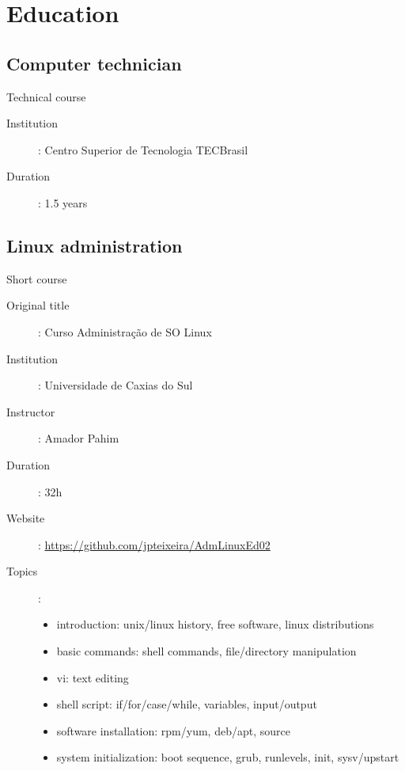 \section*{Education}
\label{sec:education}

\subsection*{Computer technician}

Technical course

\begin{description}
    \item[Institution]: Centro Superior de Tecnologia TECBrasil
    \item[Duration]: 1.5 years
\end{description}

\subsection*{Linux administration}

Short course

\begin{description}
    \item[Original title]: Curso Administração de SO Linux
    \item[Institution]: Universidade de Caxias do Sul
    \item[Instructor]: Amador Pahim
    \item[Duration]: 32h
    \item[Website]: \url{https://github.com/jpteixeira/AdmLinuxEd02}
    \item[Topics]:
        \begin{itemize}
            \item
                introduction: unix/linux history, free software, linux
                distributions
            \item basic commands: shell commands, file/directory manipulation
            \item vi: text editing
            \item shell script: if/for/case/while, variables, input/output
            \item software installation: rpm/yum, deb/apt, source
            \item
                system initialization: boot sequence, grub, runlevels, init,
                sysv/upstart
        \end{itemize}
\end{description}

